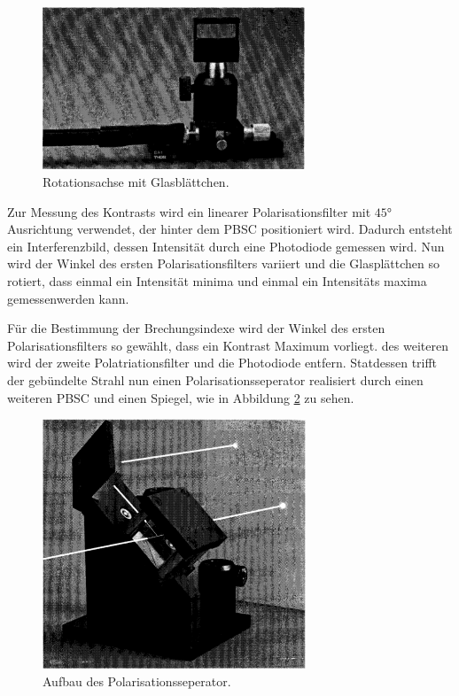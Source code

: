 \begin{figure}
     \centering
     \includegraphics[width=0.7\textwidth]{Glasblattchen.PNG}
     \caption{Rotationsachse mit Glasblättchen.\cite{skript}}
     \label{fig:glasplattchen}
\end{figure}
Zur Messung des Kontrasts wird ein linearer Polarisationsfilter mit $45\si{\degree}$
Ausrichtung verwendet, der hinter dem PBSC positioniert wird.
Dadurch entsteht ein Interferenzbild, dessen Intensität durch eine Photodiode gemessen wird.
Nun wird der Winkel des ersten Polarisationsfilters variiert
und die Glasplättchen so rotiert, dass einmal ein Intensität minima und einmal
ein Intensitäts maxima gemessenwerden kann.

Für die Bestimmung der Brechungsindexe wird der
Winkel des ersten Polarisationsfilters so gewählt, dass ein Kontrast Maximum vorliegt.
des weiteren wird der zweite Polatriationsfilter und die Photodiode entfern.
Statdessen trifft der gebündelte Strahl nun einen Polarisationsseperator realisiert durch einen
weiteren PBSC und einen Spiegel, wie in Abbildung \ref{fig:polsep} zu sehen.
\begin{figure}
     \centering
     \includegraphics[width=0.7\textwidth]{PSBC.PNG}
     \caption{Aufbau des Polarisationsseperator.\cite{skript}}
     \label{fig:polsep}
\end{figure}


